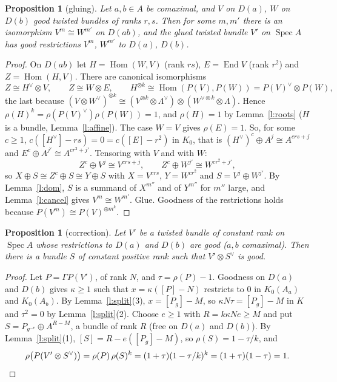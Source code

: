 \documentclass[11pt]{amsart}
\newtheorem{proposition}[theorem]{Proposition}
\theoremstyle{definition}
\theoremstyle{remark}
\newcommand{\Spec}{\operatorname{Spec}}
\newcommand{\Hom}{\operatorname{Hom}}
\newcommand{\End}{\operatorname{End}}
\begin{document}
\begin{proposition}[gluing]\label{p:cheap}
Let $a,b\in A$ be comaximal, and $V$ on $D(a)$, $W$ on $D(b)$ good twisted
bundles of ranks $r,s$. Then for some $m,m'$ there is an isomorphism
$V^{m}\cong W^{m'}$ on $D(ab)$, and the glued twisted bundle $V'$ on
$\Spec A$ has good restrictions $V^m$, $W^{m'}$ to $D(a)$, $D(b)$.
\end{proposition}
\begin{proof}
On $D(ab)$ let $H=\Hom(W,V)$ (rank $rs$), $E=\End V$ (rank $r^2$) and
$Z=\Hom(H,V)$. There are canonical isomorphisms
\[Z\cong H^\vee\otimes V,\qquad Z\cong W\otimes E,\qquad
H^{\otimes k}\cong\Hom(P(V),P(W))=P(V)^\vee\otimes P(W),\]
the last because $(V\otimes W^\vee)^{\otimes k}\cong
(V^{\otimes k}\otimes\Lambda^\vee)\otimes(W^{\vee\otimes k}\otimes\Lambda)$.
Hence $\rho(H)^k=\rho(P(V)^\vee)\rho(P(W))=1$, and $\rho(H)=1$ by
Lemma~\ref{l:roots} ($H$ is a bundle, Lemma~\ref{l:affine}). The case
$W=V$ gives $\rho(E)=1$. So, for some $c\geq1$,
$c([H^\vee]-rs)=0=c([E]-r^2)$ in $K_0$, that is $(H^\vee)^c\oplus A^j\cong A^{crs+j}$ and $E^c\oplus
A^{j'}\cong A^{cr^2+j'}$. Tensoring with $V$ and with $W$:
\[Z^c\oplus V^j\cong V^{crs+j},\qquad Z^c\oplus W^{j'}\cong W^{cr^2+j'},\]
so $X\oplus S\cong Z^c\oplus S\cong Y\oplus S$ with $X=V^{crs}$,
$Y=W^{cr^2}$ and $S=V^j\oplus W^{j'}$. By Lemma~\ref{l:dom}, $S$ is a
summand of $X^{m''}$ and of $Y^{m''}$ for $m''$ large, and
Lemma~\ref{l:cancel} gives $V^m\cong W^{m'}$. Glue. Goodness of the
restrictions holds because $P(V^m)\cong P(V)^{\oplus m^k}$.
\end{proof}

\begin{proposition}[correction]\label{p:correct}
Let $V'$ be a twisted bundle of constant rank on $\Spec A$ whose
restrictions to $D(a)$ and $D(b)$ are good ($a,b$ comaximal). Then there
is a bundle $S$ of constant positive rank such that $V'\otimes S^\vee$ is
good.
\end{proposition}
\begin{proof}
Let $P=\Gamma P(V')$, of rank $N$, and $\tau=\rho(P)-1$. Goodness on $D(a)$
and $D(b)$ gives $\kappa\geq1$ such that $x=\kappa([P]-N)$ restricts to $0$
in $K_0(A_a)$ and $K_0(A_b)$. By Lemma~\ref{l:split}(3), $x=[P_g]-M$, so
$\kappa N\tau=[P_g]-M$ in $K$ and $\tau^2=0$ by Lemma~\ref{l:split}(2).
Choose $e\geq1$ with $R=k\kappa Ne\geq M$ and put
$S=P_{g^{-e}}\oplus A^{R-M}$, a bundle of rank $R$ (free on $D(a)$ and
$D(b)$). By Lemma~\ref{l:split}(1), $[S]=R-e([P_g]-M)$, so
$\rho(S)=1-\tau/k$, and
\[\rho\bigl(P(V'\otimes S^\vee)\bigr)=\rho(P)\,\rho(S)^k
=(1+\tau)(1-\tau/k)^k=(1+\tau)(1-\tau)=1.\qedhere\]
\end{proof}
\end{document}
